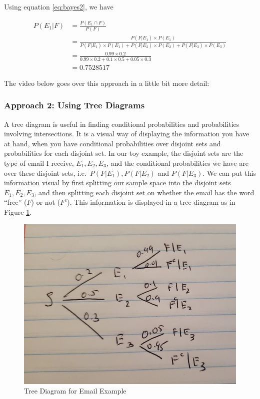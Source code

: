 \documentclass[
]{book}
\begin{document}
Using equation \eqref{eq:bayes2}, we have

\[
\begin{split}
P(E_1|F) &= \frac{P(E_1 \cap F)}{P(F)}\\
 &= \frac{P(F|E_1) \times P(E_1)}{P(F|E_1) \times P(E_1) + P(F|E_2) \times P(E_2) + P(F|E_3) \times P(E_3)} \\
&= \frac{0.99 \times 0.2}{0.99 \times 0.2 + 0.1 \times 0.5 + 0.05 \times 0.3}\\
&= 0.7528517
\end{split}
\]

The video below goes over this approach in a little bit more detail:

\hypertarget{approach-2-using-tree-diagrams}{%
\subsubsection{Approach 2: Using Tree Diagrams}\label{approach-2-using-tree-diagrams}}

A tree diagram is useful in finding conditional probabilities and probabilities involving intersections. It is a visual way of displaying the information you have at hand, when you have conditional probabilities over disjoint sets and probabilities for each disjoint set. In our toy example, the disjoint sets are the type of email I receive, \(E_1, E_2, E_3\), and the conditional probabilities we have are over these disjoint sets, i.e.~\(P(F|E_1), P(F|E_2)\) and \(P(F|E_3)\). We can put this information visual by first splitting our sample space into the disjoint sets \(E_1, E_2, E_3\), and then splitting each disjoint set on whether the email has the word ``free'' (\(F\)) or not (\(F^c\)). This information is displayed in a tree diagram as in Figure \ref{fig:tree}.

\begin{figure}
\centering
\includegraphics{images/02-tree.jpg}
\caption{\label{fig:tree}Tree Diagram for Email Example}
\end{figure}
\end{document}
